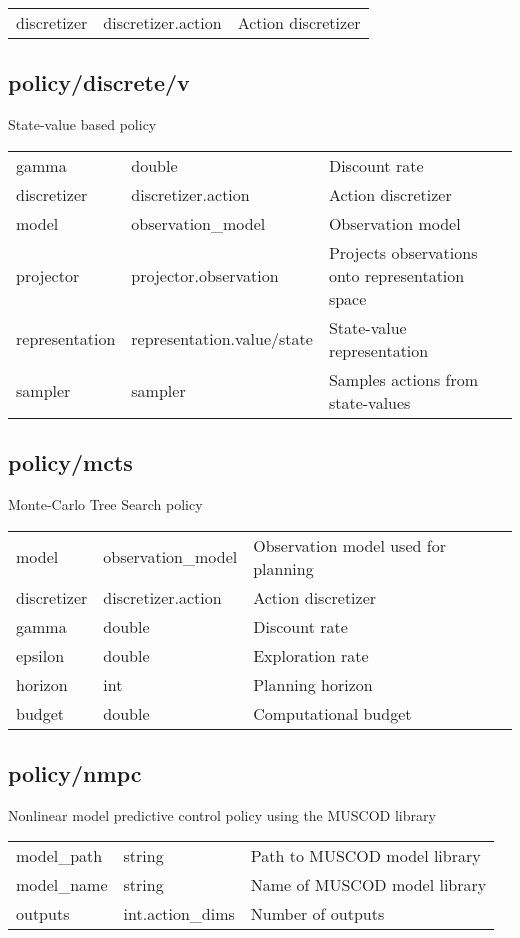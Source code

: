 \noindent\begin{tabular}{@{}lll@{}}
discretizer&discretizer.action&Action discretizer\\
\end{tabular}
\subsection{policy/discrete/v}
\noindent State-value based policy\\

\noindent\begin{tabular}{@{}lll@{}}
gamma&double&Discount rate\\
discretizer&discretizer.action&Action discretizer\\
model&observation\_model&Observation model\\
projector&projector.observation&Projects observations onto representation space\\
representation&representation.value/state&State-value representation\\
sampler&sampler&Samples actions from state-values\\
\end{tabular}
\subsection{policy/mcts}
\noindent Monte-Carlo Tree Search policy\\

\noindent\begin{tabular}{@{}lll@{}}
model&observation\_model&Observation model used for planning\\
discretizer&discretizer.action&Action discretizer\\
gamma&double&Discount rate\\
epsilon&double&Exploration rate\\
horizon&int&Planning horizon\\
budget&double&Computational budget\\
\end{tabular}
\subsection{policy/nmpc}
\noindent Nonlinear model predictive control policy using the MUSCOD library\\

\noindent\begin{tabular}{@{}lll@{}}
model\_path&string&Path to MUSCOD model library\\
model\_name&string&Name of MUSCOD model library\\
outputs&int.action\_dims&Number of outputs\\
\end{tabular}
